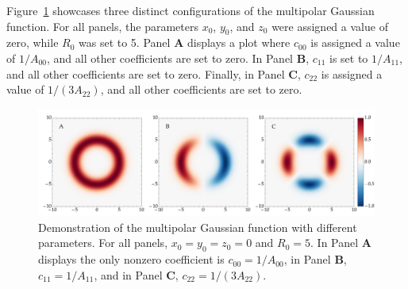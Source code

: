 Figure~\ref{fig:multipolar_gaussian_id_demo} showcases three distinct configurations of the multipolar Gaussian function. For all panels, the parameters $x_0$, $y_0$, and $z_0$ were assigned a value of zero, while $R_0$ was set to 5. Panel \textbf{A} displays a plot where $c_{00}$ is assigned a value of $1/A_{00}$, and all other coefficients are set to zero. In Panel \textbf{B}, $c_{11}$ is set to $1/A_{11}$, and all other coefficients are set to zero. Finally, in Panel \textbf{C}, $c_{22}$ is assigned a value of $1/(3A_{22})$, and all other coefficients are set to zero.

\begin{figure}[!ht]
  \centering
  \includegraphics[width=\linewidth]{img/wave_scattering/multipolar_gaussian_id_examples.png}
  \caption{Demonstration of the multipolar Gaussian function with different parameters. For all panels, $x_0 = y_0 = z_0 = 0$ and $R_0 = 5$. In Panel \textbf{A} displays the only nonzero coefficient is $c_{00} = 1/A_{00}$, in Panel \textbf{B}, $c_{11} = 1/A_{11}$, and in Panel \textbf{C}, $c_{22} = 1/(3A_{22})$.}
  \label{fig:multipolar_gaussian_id_demo}
\end{figure}